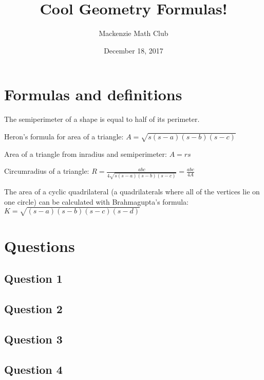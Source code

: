 

\usepackage{siunitx}

\title{Cool Geometry Formulas!}
\author{Mackenzie Math Club}
\date{December 18, 2017}



	\section{Formulas and definitions}
		The semiperimeter of a shape is equal to half of its perimeter.

		Heron's formula for area of a triangle: $\displaystyle A = \sqrt{s(s-a)(s-b)(s-c)}$

		Area of a triangle from inradius and semiperimeter: $\displaystyle A = rs$

		Circumradius of a triangle: $\displaystyle R = \frac{abc}{4\sqrt{s(s-a)(s-b)(s-c)}} = \frac{abc}{4A}$

		The area of a cyclic quadrilateral (a quadrilaterals where all of the vertices lie on one circle) can be calculated with Brahmagupta's formula: $\displaystyle K = \sqrt{(s-a)(s-b)(s-c)(s-d)}$
	\section{Questions}
		\subsection{Question 1}
			
			\solutionspace{1in}
		\subsection{Question 2}
			
		\newpage
		\subsection{Question 3}
			
			\solutionspace{2in}
		\subsection{Question 4}
			

